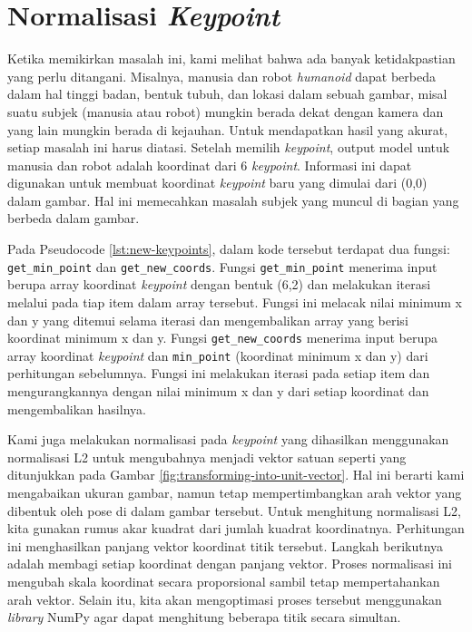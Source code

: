 \newpage
\section{Normalisasi \textit{Keypoint}}
\label{sec:keypoint-normalization}

Ketika memikirkan masalah ini, kami melihat bahwa ada banyak ketidakpastian yang perlu ditangani. Misalnya, manusia dan robot \textit{humanoid} dapat berbeda dalam hal tinggi badan, bentuk tubuh, dan lokasi dalam sebuah gambar, misal suatu subjek (manusia atau robot) mungkin berada dekat dengan kamera dan yang lain mungkin berada di kejauhan.
Untuk mendapatkan hasil yang akurat, setiap masalah ini harus diatasi.
Setelah memilih \textit{keypoint}, output model untuk manusia dan robot adalah koordinat dari 6 \textit{keypoint}. Informasi ini dapat digunakan untuk membuat koordinat \textit{keypoint} baru yang dimulai dari (0,0) dalam gambar. Hal ini memecahkan masalah subjek yang muncul di bagian yang berbeda dalam gambar.


Pada Pseudocode \ref{lst:new-keypoints}, dalam kode tersebut terdapat dua fungsi: \verb|get_min_point| dan \verb|get_new_coords|. Fungsi \verb|get_min_point| menerima input berupa array koordinat \textit{keypoint} dengan bentuk (6,2) dan melakukan iterasi melalui pada tiap item dalam array tersebut.
Fungsi ini melacak nilai minimum x dan y yang ditemui selama iterasi dan mengembalikan array yang berisi koordinat minimum x dan y.
Fungsi \verb|get_new_coords| menerima input berupa array koordinat \textit{keypoint} dan \verb|min_point| (koordinat minimum x dan y) dari perhitungan sebelumnya. Fungsi ini melakukan iterasi pada setiap item dan mengurangkannya dengan nilai minimum x dan y dari setiap koordinat dan mengembalikan hasilnya.

Kami juga melakukan normalisasi pada \textit{keypoint} yang dihasilkan menggunakan normalisasi L2 untuk mengubahnya menjadi vektor satuan seperti yang ditunjukkan pada Gambar \ref{fig:transforming-into-unit-vector}. Hal ini berarti kami mengabaikan ukuran gambar, namun tetap mempertimbangkan arah vektor yang dibentuk oleh pose di dalam gambar tersebut.
Untuk menghitung normalisasi L2, kita gunakan rumus akar kuadrat dari jumlah kuadrat koordinatnya. Perhitungan ini menghasilkan panjang vektor koordinat titik tersebut.
Langkah berikutnya adalah membagi setiap koordinat dengan panjang vektor. Proses normalisasi ini mengubah skala koordinat secara proporsional sambil tetap mempertahankan arah vektor. Selain itu, kita akan mengoptimasi proses tersebut menggunakan \textit{library} NumPy agar dapat menghitung beberapa titik secara simultan.

